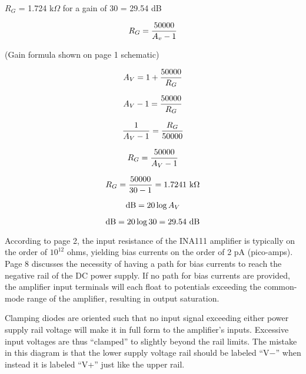 





$R_G$ = 1.724 k$\Omega$ for a gain of 30 = 29.54 dB

\vskip 10pt

$$R_G = {50000 \over {A_v - 1}}$$







(Gain formula shown on page 1 schematic)

$$A_V = 1 + {50000 \over R_G}$$

$$A_V - 1 = {50000 \over R_G}$$

$${1 \over A_V - 1} = {R_G \over 50000}$$

$$R_G = {50000 \over A_V - 1}$$

$$R_G = {50000 \over 30 - 1} = 1.7241 \hbox{ k}\Omega$$

\vskip 10pt

$$\hbox{dB} = 20 \log A_V$$

$$\hbox{dB} = 20 \log 30 = 29.54 \hbox{ dB}$$

According to page 2, the input resistance of the INA111 amplifier is typically on the order of $10^{12}$ ohms, yielding bias currents on the order of 2 pA (pico-amps).  Page 8 discusses the necessity of having a path for bias currents to reach the negative rail of the DC power supply.  If no path for bias currents are provided, the amplifier input terminals will each float to potentials exceeding the common-mode range of the amplifier, resulting in output saturation.

\vskip 10pt

Clamping diodes are oriented such that no input signal exceeding either power supply rail voltage will make it in full form to the amplifier's inputs.  Excessive input voltages are thus ``clamped'' to slightly beyond the rail limits.  The mistake in this diagram is that the lower supply voltage rail should be labeled ``V$-$'' when instead it is labeled ``V+'' just like the upper rail.





